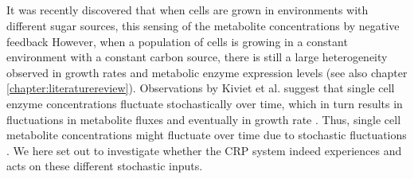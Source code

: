 
\subsection{}

%
It was recently discovered that when cells are grown in environments with different sugar sources, 
this sensing of the metabolite concentrations by negative feedback 
%
However, when a population of cells is growing in a constant environment with a constant carbon source,
there is still a large heterogeneity observed in growth rates and metabolic enzyme expression levels \cite{Kiviet2014} (see also chapter \ref{chapter:literaturereview}).
%
Observations by Kiviet et al. suggest that single cell enzyme concentrations fluctuate stochastically over time, which in turn results in fluctuations in metabolite fluxes and eventually in growth rate \cite{Kiviet2014}.
%
Thus, single cell metabolite concentrations might fluctuate over time due to stochastic fluctuations .
%
%
We here set out to investigate whether the CRP system indeed experiences and acts on these different stochastic inputs.

